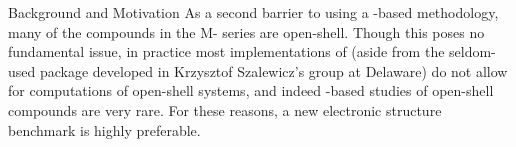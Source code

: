 \begin{section}{Background and Motivation}
As a second barrier to using a \sapt-based methodology, many of the compounds in the M- series are
open-shell. Though this poses no fundamental issue, 
in practice most implementations of \sapt (aside from the
seldom-used  package developed in Krzysztof Szalewicz's group at
Delaware) do not allow for computations of open-shell systems, and indeed
\sapt-based studies of open-shell compounds are very
rare.\cite{Zuchowski2008a} For these reasons, a new electronic structure
benchmark is highly preferable.


\end{section}


